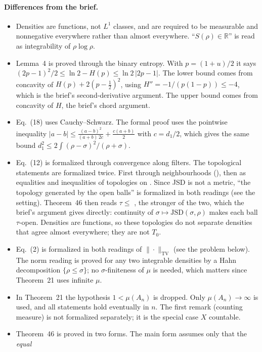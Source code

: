 \documentclass[11pt]{article}
\begin{document}
\paragraph{Differences from the brief.}
\begin{itemize}
\item Densities are functions, not $L^1$ classes, and are required to be measurable and
  nonnegative everywhere rather than almost everywhere. ``$S(\rho) \in \mathbb{R}$'' is read as
  integrability of $\rho\log\rho$.
\item Lemma~4 is proved through the binary entropy. With $p = (1+u)/2$ it says
  $(2p-1)^2/2 \le \ln 2 - H(p) \le \ln 2\,|2p-1|$. The lower bound comes from concavity of
  $H(p) + 2(p - \tfrac12)^2$, using $H'' = -1/(p(1-p)) \le -4$, which is the brief's
  second-derivative argument. The upper bound comes from concavity of $H$, the brief's chord
  argument.
\item Eq.~(18) uses Cauchy--Schwarz. The formal proof uses the pointwise inequality
  $|a-b| \le \frac{(a-b)^2}{(a+b)\,2c} + \frac{c(a+b)}{2}$ with $c = d_1/2$, which gives the same
  bound $d_1^2 \le 2\int (\rho-\sigma)^2/(\rho+\sigma)$.
\item Eq.~(12) is formalized through convergence along filters. The topological statements are
  formalized twice. First through neighbourhoods (), then as equalities and
  inequalities of topologies on . Since JSD is not a metric, ``the topology
  generated by the open balls'' is formalized in both readings (see the setting). Theorem~46
  then reads $\tau \le$ , the stronger of the two, which the brief's
  argument gives directly: continuity of $\sigma \mapsto \mathrm{JSD}(\sigma, \rho)$ makes each
  ball $\tau$-open. Densities are functions, so these topologies do not separate densities that
  agree almost everywhere; they are not $T_0$.
\item Eq.~(2) is formalized in both readings of $\|\cdot\|_{\mathrm{TV}}$ (see the problem
  below). The norm reading is proved for any two integrable densities by a Hahn decomposition
  $\{\rho \le \sigma\}$; no $\sigma$-finiteness of $\mu$ is needed, which matters since
  Theorem~21 uses infinite $\mu$.
\item In Theorem~21 the hypothesis $1 < \mu(A_n)$ is dropped. Only $\mu(A_n) \to \infty$ is
  used, and all statements hold eventually in $n$. The first remark (counting measure) is not
  formalized separately; it is the special case $X$ countable.
\item Theorem~46 is proved in two forms. The main form assumes only that the \emph{equal}

\end{itemize}
\end{document}
